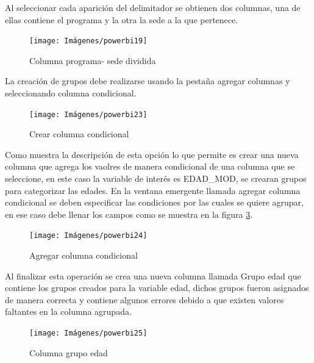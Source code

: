 \documentclass[
]{book}
\begin{document}
Al seleccionar cada aparición del delimitador se obtienen dos columnas, una de ellas contiene el programa y la otra la sede a la que pertenece.

\begin{figure}

{\centering \texttt{[image: Imágenes/powerbi19]} 

}

\caption{Columna programa- sede dividida}\label{fig:columnadivididacondelimitador-fig}
\end{figure}

La creación de grupos debe realizarse usando la pestaña agregar columnas y seleccionando columna condicional.

\begin{figure}

{\centering \texttt{[image: Imágenes/powerbi23]} 

}

\caption{Crear columna condicional}\label{fig:columnacondicional-fig}
\end{figure}

Como muestra la descripción de esta opción lo que permite es crear una nueva columna que agrega los vaolres de manera condicional de una columna que se seleccione, en este caso la variable de interés es EDAD\_MOD, se crearan grupos para categorizar las edades. En la ventana emergente llamada agregar columna condicional se deben especificar las condiciones por las cuales se quiere agrupar, en ese caso debe llenar los campos como se muestra en la figura \ref{fig:agregarcolumnacondicional-fig}.

\begin{figure}

{\centering \texttt{[image: Imágenes/powerbi24]} 

}

\caption{Agregar columna condicional}\label{fig:agregarcolumnacondicional-fig}
\end{figure}

Al finalizar esta operación se crea una nueva columna llamada Grupo edad que contiene los grupos creados para la variable edad, dichos grupos fueron asignados de manera correcta y contiene algunos errores debido a que existen valores faltantes en la columna agrupada.

\begin{figure}

{\centering \texttt{[image: Imágenes/powerbi25]} 

}

\caption{Columna grupo edad}\label{fig:columnacondicionalfinal-fig}
\end{figure}
\end{document}
